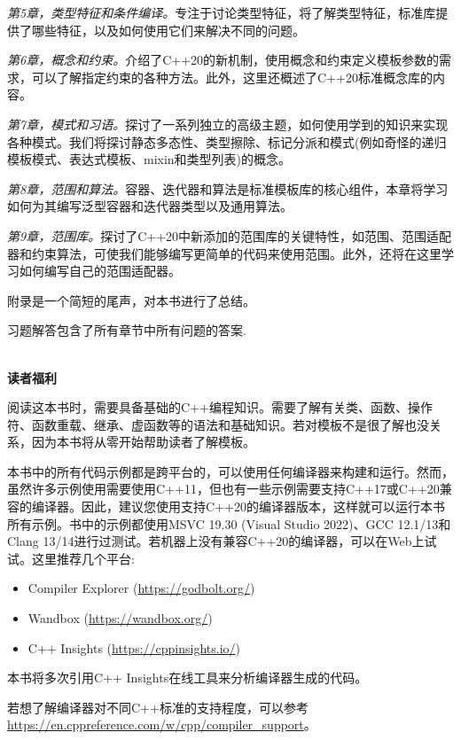 \textit{第5章，类型特征和条件编译。}专注于讨论类型特征，将了解类型特征，标准库提供了哪些特征，以及如何使用它们来解决不同的问题。

\textit{第6章，概念和约束。}介绍了C++20的新机制，使用概念和约束定义模板参数的需求，可以了解指定约束的各种方法。此外，这里还概述了C++20标准概念库的内容。

\textit{第7章，模式和习语。}探讨了一系列独立的高级主题，如何使用学到的知识来实现各种模式。我们将探讨静态多态性、类型擦除、标记分派和模式(例如奇怪的递归模板模式、表达式模板、mixin和类型列表)的概念。

\textit{第8章，范围和算法。}容器、迭代器和算法是标准模板库的核心组件，本章将学习如何为其编写泛型容器和迭代器类型以及通用算法。

\textit{第9章，范围库。}探讨了C++20中新添加的范围库的关键特性，如范围、范围适配器和约束算法，可使我们能够编写更简单的代码来使用范围。此外，还将在这里学习如何编写自己的范围适配器。

附录是一个简短的尾声，对本书进行了总结。

习题解答包含了所有章节中所有问题的答案.

\hspace*{\fill} \\ %
\noindent
\textbf{读者福利}

阅读这本书时，需要具备基础的C++编程知识。需要了解有关类、函数、操作符、函数重载、继承、虚函数等的语法和基础知识。若对模板不是很了解也没关系，因为本书将从零开始帮助读者了解模板。

本书中的所有代码示例都是跨平台的，可以使用任何编译器来构建和运行。然而，虽然许多示例使用需要使用C++11，但也有一些示例需要支持C++17或C++20兼容的编译器。因此，建议您使用支持C++20的编译器版本，这样就可以运行本书所有示例。书中的示例都使用MSVC 19.30 (Visual Studio 2022)、GCC 12.1/13和Clang 13/14进行过测试。若机器上没有兼容C++20的编译器，可以在Web上试试。这里推荐几个平台:

\begin{itemize}
\item
Compiler Explorer (\url{https://godbolt.org/})

\item
Wandbox (\url{https://wandbox.org/})

\item
C++ Insights (\url{https://cppinsights.io/})
\end{itemize}

本书将多次引用C++ Insights在线工具来分析编译器生成的代码。

若想了解编译器对不同C++标准的支持程度，可以参考\url{https://en.cppreference.com/w/cpp/compiler\_support}。

